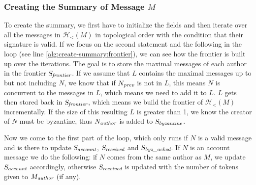 \documentclass{article}
\begin{document}
\subsubsection{Creating the Summary of Message \(M\)}
To create the summary, we first have to initialize the fields and then iterate over all the messages in $\mathcal H_<(M)$ in topological order with the condition that their signature is valid. If we focus on the second statement and the following in the loop (see line \ref{alg:create-summary:frontier}), we can see how the frontier is built up over the iterations. The goal is to store the maximal messages of each author in the frontier $\textsl{S}_\emph{frontier}$. If we assume that $L$ contains the maximal messages up to but not including $N$, we know that if $N_\emph{prev}$ is not in $L$, this means $N$ is concurrent to the messages in $L$, which means we need to add it to $L$. $L$ gets then stored back in $\textsl{S}_\emph{frontier}$, which means we build the frontier of $\mathcal H_<(M)$ incrementally. If the size of this resulting $L$ is greater than 1, we know the creator of $N$ must be byzantine, thus $N_\emph{author}$ is added to $\textsl{S}_\emph{byzantine}$.

Now we come to the first part of the loop, which only runs if $N$ is a valid message and is there to update $\textsl{S}_\emph{account}$, $\textsl{S}_\emph{received}$ and $\textsl{S}_\emph{byz\_acked}$. If $N$ is an account message we do the following: if $N$ comes from the same author as $M$, we update $\textsl{S}_\emph{account}$ accordingly, otherwise $\textsl{S}_\emph{received}$ is updated with the number of tokens given to $M_\emph{author}$ (if any).
\end{document}

